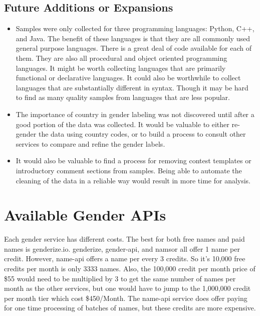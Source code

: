 \documentclass[12pt]{article}
\begin{document}
\subsection{Future Additions or Expansions}
\begin{itemize}
    \item Samples were only collected for three programming languages: Python, C++, and Java. The benefit of these languages is that they are all commonly used general purpose languages. There is a great deal of code available for each of them. They are also all procedural and object oriented programming languages. It might be worth collecting languages that are primarily functional or declarative languages. It could also be worthwhile to collect languages that are substantially different in syntax. Though it may be hard to find as many quality samples from languages that are less popular.
    \item The importance of country in gender labeling was not discovered until after a good portion of the data was collected. It would be valuable to either re-gender the data using country codes, or to build a process to consult other services to compare and refine the gender labels.
    \item It would also be valuable to find a process for removing contest templates or introductory comment sections from samples. Being able to automate the cleaning of the data in a reliable way would result in more time for analysis.
\end{itemize}


\newpage




\newpage
\appendix


\section{Available Gender APIs}
Each gender service has different costs. The best for both free names and paid names is genderize.io. genderize, gender-api, and namsor all offer 1 name per credit. However, name-api offers a name per every 3 credits. So it's 10,000 free credits per month is only 3333 names. Also, the 100,000 credit per month price of \$55 would need to be multiplied by 3 to get the same number of names per month as the other services, but one would have to jump to the 1,000,000 credit per month tier which cost \$450/Month. The name-api service does offer paying for one time processing of batches of names, but these credits are more expensive.
\end{document}
